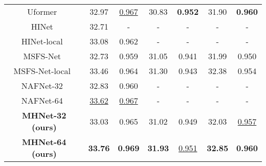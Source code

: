 \documentclass[lettersize,journal]{IEEEtran}
\begin{document}
\begin{table}[ht]
{\begin{tabular}{ccccc||cc}
    \\
    Uformer~\cite{Wang_2022_CVPR} &32.97 & \underline{0.967} &30.83 &\textbf{0.952} &31.90  &\textbf{0.960}
     \\
    HINet~\cite{Chen_2021_CVPR}&32.71&-&-&-&-&-
    \\
    HINet-local~\cite{Chen_2021_CVPR}&33.08&0.962&-&-&-&-
    \\
    MSFS-Net~\cite{MSFSnet} & 32.73 & 0.959 & 31.05 & 0.941& 31.99 & 0.950 
    \\
    MSFS-Net-local~\cite{MSFSnet} & 33.46 & 0.964 & 31.30 & 0.943 & 32.38 & 0.954 
    \\
    \hline
    NAFNet-32~\cite{chen2022simple}&32.83&0.960&-&-&-&-
    \\
    NAFNet-64~\cite{chen2022simple}&\underline{33.62}&\underline{0.967}&-&-&-&-
    \\
    \hline
    \textbf{MHNet-32 (ours)}&33.03&0.965&31.02&0.949&32.03  &\underline{0.957}
    \\
    \textbf{MHNet-64 (ours)}&\textbf{33.76}&\textbf{0.969}&\textbf{31.93}&\underline{0.951}&\textbf{32.85}  & \textbf{0.960}
    \\
    \hline
\end{tabular}
}

\end{table}
\end{document}
